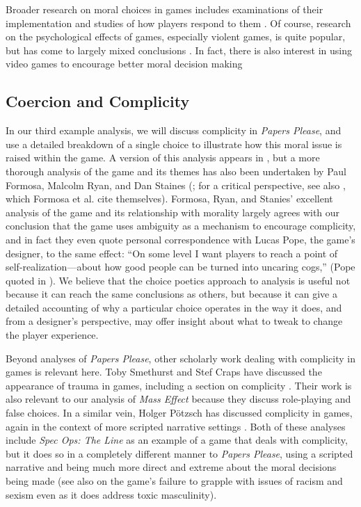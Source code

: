 \documentclass[arts,article,submit,moreauthors,pdftex,10pt,a4paper]{Definitions/mdpi}
\begin{document}
Broader research on moral choices in games includes examinations of their implementation and studies of how players respond to them \citep{svelch2010good,weaver2012mirrored,consalvo2016playing}.
%
Of course, research on the psychological effects of games, especially violent games, is quite popular, but has come to largely mixed conclusions \citep{ferguson2008school,ellithorpe2015moral}.
%
In fact, there is also interest in using video games to encourage better moral decision making \citep{kastarov2017training}

\subsection{Coercion and Complicity}

In our third example analysis, we will discuss complicity in \emph{Papers Please}, and use a detailed breakdown of a single choice to illustrate how this moral issue is raised within the game.
%
A version of this analysis appears in \citep{mawhorter2016artificial}, but a more thorough analysis of the game and its themes has also been undertaken by 
Paul Formosa, Malcolm Ryan, and Dan Staines (\citeyear{formosa2016papers}; for a critical perspective, see also \cite{alexander2013designing}, which Formosa et al. cite themselves).
%
Formosa, Ryan, and Stanies' excellent analysis of the game and its relationship with morality largely agrees with our conclusion that the game uses ambiguity as a mechanism to encourage complicity, and in fact they even quote personal correspondence with Lucas Pope, the game's designer, to the same effect: ``On some level I want players to reach a point of self-realization---about how good people can be turned into uncaring cogs,'' (Pope quoted in \cite{formosa2016papers}).
%
We believe that the choice poetics approach to analysis is useful not because it can reach the same conclusions as others, but because it can give a detailed accounting of why a particular choice operates in the way it does, and from a designer's perspective, may offer insight about what to tweak to change the player experience.


Beyond analyses of \emph{Papers Please}, other scholarly work dealing with complicity in games is relevant here.
%
Toby Smethurst and Stef Craps have discussed the appearance of trauma in games, including a section on complicity \citep{smethurst2015playing}.
%
Their work is also relevant to our analysis of \emph{Mass Effect} because they discuss role-playing and false choices.
%
In a similar vein, Holger Pötzsch has discussed complicity in games, again in the context of more scripted narrative settings \citep{potzsch2017selective}.
%
Both of these analyses include \emph{Spec Ops: The Line} \citep{yager2012spec} as an example of a game that deals with complicity, but it does so in a completely different manner to \emph{Papers Please}, using a scripted narrative and being much more direct and extreme about the moral decisions being made (see also \cite{murray2016race} on the game's failure to grapple with issues of racism and sexism even as it does address toxic masculinity).
\end{document}
